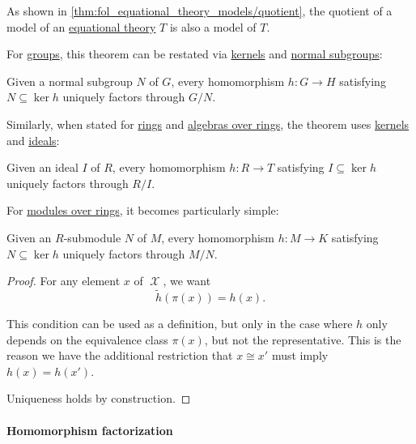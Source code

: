 \begin{comments}
  \item As shown in \cref{thm:fol_equational_theory_models/quotient}, the quotient of a model of an \hyperref[def:fol_equational_theory]{equational theory} \( T \) is also a model of \( T \).

  \item For \hyperref[def:group]{groups}, this theorem can be restated via \hyperref[def:group/kernel]{kernels} and \hyperref[def:normal_subgroup]{normal subgroups}:
  \begin{displayquote}
    Given a normal subgroup \( N \) of \( G \), every homomorphism \( h: G \to H \) satisfying \( N \subseteq \ker h \) uniquely factors through \( G / N \).
  \end{displayquote}

  Similarly, when stated for \hyperref[def:ring]{rings} and \hyperref[def:algebra_over_ring]{algebras over rings}, the theorem uses \hyperref[def:ring/kernel]{kernels} and \hyperref[def:semiring_ideal]{ideals}:
  \begin{displayquote}
    Given an ideal \( I \) of \( R \), every homomorphism \( h: R \to T \) satisfying \( I \subseteq \ker h \) uniquely factors through \( R / I \).
  \end{displayquote}

  For \hyperref[def:module]{modules over rings}, it becomes particularly simple:
  \begin{displayquote}
    Given an \( R \)-submodule \( N \) of \( M \), every homomorphism \( h: M \to K \) satisfying \( N \subseteq \ker h \) uniquely factors through \( M / N \).
  \end{displayquote}
\end{comments}
\begin{proof}
  For any element \( x \) of \( \mscrX \), we want
  \begin{equation*}
    \widetilde{h}(\pi(x)) = h(x).
  \end{equation*}

  This condition can be used as a definition, but only in the case where \( h \) only depends on the equivalence class \( \pi(x) \), but not the representative. This is the reason we have the additional restriction that \( x \cong x' \) must imply \( h(x) = h(x') \).

  Uniqueness holds by construction.
\end{proof}

\paragraph{Homomorphism factorization}

